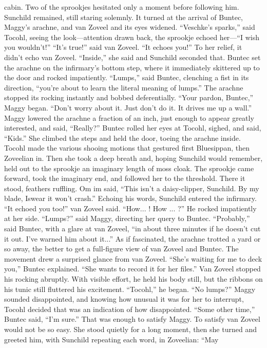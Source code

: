 \documentclass[9pt]{article}
\begin{document}
cabin. Two of the sprookjes hesitated only a moment before following him. Sunchild remained, still
staring solemnly.
It turned at the arrival of Buntec, Maggy’s arachne, and van Zoveel and its eyes widened.
“Veschke’s sparks,” said Tocohl, seeing the look—attention drawn back, the sprookje echoed her—“I
wish you wouldn’t!”
“It’s true!” said van Zoveel. “It echoes you!”
To her relief, it didn’t echo van Zoveel. “Inside,” she said and Sunchild seconded that.
Buntec set the arachne on the infirmary’s bottom step, where it immediately skittered up to the door
and rocked impatiently. “Lumps,” said Buntec, clenching a fist in its direction, “you’re about to learn the
literal meaning of lumps.”
The arachne stopped its rocking instantly and bobbed deferentially. “Your pardon, Buntec,” Maggy
began.
“Don’t worry about it. Just don’t do it. It drives me up a wall.”
Maggy lowered the arachne a fraction of an inch, just enough to appear greatly interested, and said,
“Really?”
Buntec rolled her eyes at Tocohl, sighed, and said, “Kids.” She climbed the steps and held the door,
toeing the arachne inside. Tocohl made the various shooing motions that gestured first Bluesippan, then
Zoveelian in.
Then she took a deep breath and, hoping Sunchild would remember, held out to the sprookje an
imaginary length of moss cloak. The sprookje came forward, took the imaginary end, and followed her to
the threshold.
There it stood, feathers ruffling. Om im said, “This isn’t a daisy-clipper, Sunchild. By my blade, Iswear it won’t crash.” Echoing his words, Sunchild entered the infirmary.
“It echoed you too!” van Zoveel said. “How... ! How ... ?” He rocked impatiently at her side.
“Lumps?” said Maggy, directing her query to Buntec.
“Probably,” said Buntec, with a glare at van Zoveel, “in about three minutes if he doesn’t cut it out.
I’ve warned him about it...”
As if fascinated, the arachne trotted a yard or so away, the better to get a full-figure view of van
Zoveel and Buntec. The movement drew a surprised glance from van Zoveel. “She’s waiting for me to
deck you,” Buntec explained. “She wants to record it for her files.”
Van Zoveel stopped his rocking abruptly. With visible effort, he held his body still, but the ribbons on
his tunic still fluttered his excitement. “Tocohl,” he began.
“No lumps?” Maggy sounded disappointed, and knowing how unusual it was for her to interrupt,
Tocohl decided that was an indication of how disappointed.
“Some other time,” Buntec said, “I’m sure.”
That was enough to satisfy Maggy. To satisfy van Zoveel would not be so easy. She stood quietly for
a long moment, then she turned and greeted him, with Sunchild repeating each word, in Zoveelian: “May
\end{document}

